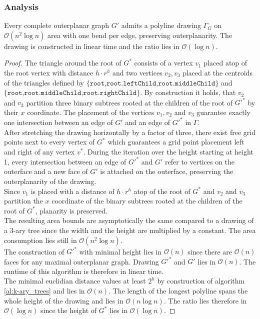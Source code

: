 \subsubsection{Analysis}

\begin{theorem}
	Every complete outerplanar graph $G'$ admits a polyline drawing $\Gamma_G$ on $\mathcal{O}(n^2 \log n)$ area with one bend per edge, preserving outerplanarity. The drawing is constructed in linear time and the ratio lies in $\mathcal{O}(\log n)$.
\end{theorem}

\begin{proof}
	The triangle around the root of $G^*$ consists of a vertex $v_1$ placed atop of the root vertex with distance $h\cdot r^h$ and two vertices $v_2,v_3$ placed at the centroids of the triangles defined by $\{\texttt{root,root.leftChild,root.middleChild}\}$ and $\{\texttt{root,root.middleChild,root.rightChild}\}$. By construction it holds, that $v_2$ and $v_3$ partition three binary subtrees rooted at the children of the root of $G'^*$ by their $x$ coordinate. The placement of the vertices $v_1,v_2$ and $v_3$ guarantee exactly one intersection between an edge of $G'$ and an edge of $G'^*$ in $\Gamma$.\\
	After stretching the drawing horizontally by a factor of three, there exist free grid points next to every vertex of $G^*$ which guarantees a grid point placement left and right of any vertex $v^*$. During the iteration over the height starting at height 1, every intersection between an edge of $G'^*$ and $G'$ refer to vertices on the outerface and a new face of $G'$ is attached on the outerface, preserving the outerplanarity of the drawing.\\
	Since $v_1$ is placed with a distance of $h\cdot r^h$ atop of the root of $G^*$ and $v_2$ and $v_3$ partition the $x$ coordinate of the binary subtrees rooted at the children of the root of $G^*$, planarity is preserved.\\
	The resulting area bounds are asymptotically the same compared to a drawing of a $3$-ary tree since the width and the height are multiplied by a constant. The area consumption lies still in $\mathcal{O}(n^2 \log n)$.\\
	The construction of $G'^*$ with minimal height lies in $\mathcal{O}(n)$ since there are $\mathcal{O}(n)$ faces for any maximal outerplanar graph. Drawing $G'^*$ and $G'$ lies in $\mathcal{O}(n)$. The runtime of this algorithm is therefore in linear time.\\
	The minimal euclidian distance values at least $2^h$ by construction of algorithm \ref{al:k-ary_trees} and lies in $\mathcal{O}(n)$. The length of the longest polyline spans the whole height of the drawing and lies in $\mathcal{O}(n \log n)$. The ratio lies therefore in $\mathcal{O}(\log n)$ since the height of $G^*$ lies in $\mathcal{O}(\log n)$.
\end{proof}
